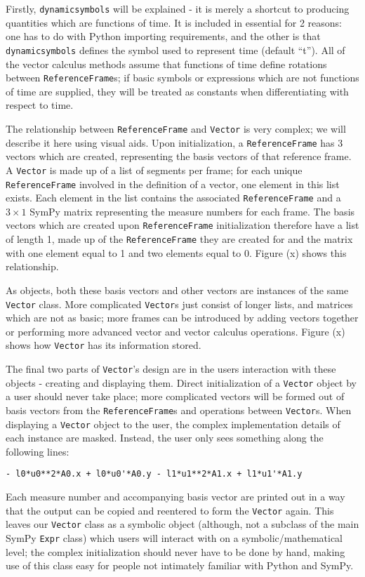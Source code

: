 \documentclass[twocolumn,10pt]{asme2e}
\begin{document}
Firstly, \verb|dynamicsymbols| will be explained - it is merely a shortcut to
producing quantities which are functions of time.
It is included in essential for 2 reasons: one has to do with Python importing
requirements, and the other is that \verb|dynamicsymbols| defines the symbol
used to represent time (default ``t'').
All of the vector calculus methods assume that functions of time define
rotations between \verb|ReferenceFrame|s; if basic symbols or expressions which
are not functions of time are supplied, they will be treated as constants when
differentiating with respect to time.

The relationship between \verb|ReferenceFrame| and \verb|Vector| is very
complex; we will describe it here using visual aids.
Upon initialization, a \verb|ReferenceFrame| has 3 vectors which are created,
representing the basis vectors of that reference frame.
A \verb|Vector| is made up of a list of segments per frame; for each unique
\verb|ReferenceFrame| involved in the definition of a vector, one element in
this list exists.
Each element in the list contains the associated \verb|ReferenceFrame| and a
$3\times1$ SymPy matrix representing the measure numbers for each frame.
The basis vectors which are created upon \verb|ReferenceFrame| initialization
therefore have a list of length 1, made up of the \verb|ReferenceFrame| they
are created for and the matrix with one element equal to 1 and two elements
equal to 0. Figure (x) shows this relationship.

As objects, both these basis vectors and other vectors are instances of the
same \verb|Vector| class.
More complicated \verb|Vector|s just consist of longer lists, and matrices
which are not as basic; more frames can be introduced by adding vectors
together or performing more advanced vector and vector calculus operations.
Figure (x) shows how \verb|Vector| has its information stored.

The final two parts of \verb|Vector|'s design are in the users interaction with
these objects - creating and displaying them.
Direct initialization of a \verb|Vector| object by a user should never take
place; more complicated vectors will be formed out of basis vectors from the
\verb|ReferenceFrame|s and operations between \verb|Vector|s.
When displaying a \verb|Vector| object to the user, the complex implementation
details of each instance are masked.
Instead, the user only sees something along the following lines:
\begin{verbatim}
- l0*u0**2*A0.x + l0*u0'*A0.y - l1*u1**2*A1.x + l1*u1'*A1.y
\end{verbatim}
Each measure number and accompanying basis vector are printed out in a way that
the output can be copied and reentered to form the \verb|Vector| again.
This leaves our \verb|Vector| class as a symbolic object (although, not a
subclass of the main SymPy \verb|Expr| class) which users will interact with on
a symbolic/mathematical level; the complex initialization should never have to
be done by hand, making use of this class easy for people not intimately
familiar with Python and SymPy.
\end{document}
